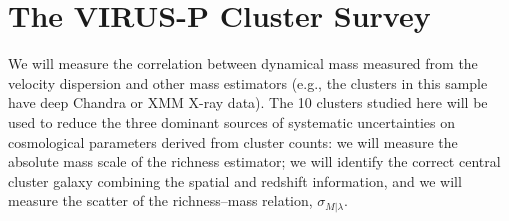 \documentclass[12pt]{article}
\begin{document}
\section{The VIRUS-P Cluster Survey}\label{sec:vp project}
We will measure the correlation between dynamical mass measured from the velocity dispersion and other mass estimators (e.g., the clusters in this sample have deep Chandra or XMM X-ray data). The 10 clusters studied here will be used to reduce the three dominant sources of systematic uncertainties on cosmological parameters derived from cluster counts: we will measure the absolute mass scale of the richness estimator; we will identify the correct central cluster galaxy combining the spatial and redshift information, and we will measure the scatter of the richness–mass relation, $\sigma_{M|\lambda}$.
\end{document}

